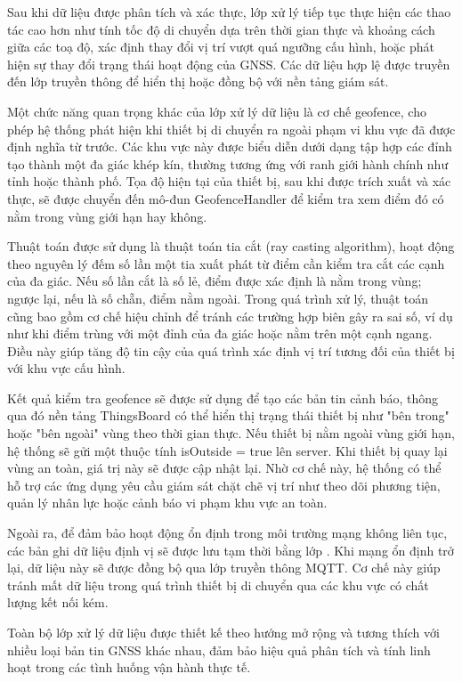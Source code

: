 \documentclass[../DoAn.tex]{subfiles}
\begin{document}
Sau khi dữ liệu được phân tích và xác thực, lớp xử lý tiếp tục thực hiện các thao tác cao hơn như tính tốc độ di chuyển dựa trên thời gian thực và khoảng cách giữa các toạ độ, xác định thay đổi vị trí vượt quá ngưỡng cấu hình, hoặc phát hiện sự thay đổi trạng thái hoạt động của GNSS. Các dữ liệu hợp lệ được truyền đến lớp truyền thông để hiển thị hoặc đồng bộ với nền tảng giám sát.

Một chức năng quan trọng khác của lớp xử lý dữ liệu là cơ chế geofence, cho phép hệ thống phát hiện khi thiết bị di chuyển ra ngoài phạm vi khu vực đã được định nghĩa từ trước. Các khu vực này được biểu diễn dưới dạng tập hợp các đỉnh tạo thành một đa giác khép kín, thường tương ứng với ranh giới hành chính như tỉnh hoặc thành phố. Tọa độ hiện tại của thiết bị, sau khi được trích xuất và xác thực, sẽ được chuyển đến mô-đun GeofenceHandler để kiểm tra xem điểm đó có nằm trong vùng giới hạn hay không.

Thuật toán được sử dụng là thuật toán tia cắt (ray casting algorithm), hoạt động theo nguyên lý đếm số lần một tia xuất phát từ điểm cần kiểm tra cắt các cạnh của đa giác. Nếu số lần cắt là số lẻ, điểm được xác định là nằm trong vùng; ngược lại, nếu là số chẵn, điểm nằm ngoài. Trong quá trình xử lý, thuật toán cũng bao gồm cơ chế hiệu chỉnh để tránh các trường hợp biên gây ra sai số, ví dụ như khi điểm trùng với một đỉnh của đa giác hoặc nằm trên một cạnh ngang. Điều này giúp tăng độ tin cậy của quá trình xác định vị trí tương đối của thiết bị với khu vực cấu hình.

Kết quả kiểm tra geofence sẽ được sử dụng để tạo các bản tin cảnh báo, thông qua đó nền tảng ThingsBoard có thể hiển thị trạng thái thiết bị như "bên trong" hoặc "bên ngoài" vùng theo thời gian thực. Nếu thiết bị nằm ngoài vùng giới hạn, hệ thống sẽ gửi một thuộc tính isOutside = true lên server. Khi thiết bị quay lại vùng an toàn, giá trị này sẽ được cập nhật lại. Nhờ cơ chế này, hệ thống có thể hỗ trợ các ứng dụng yêu cầu giám sát chặt chẽ vị trí như theo dõi phương tiện, quản lý nhân lực hoặc cảnh báo vi phạm khu vực an toàn.

Ngoài ra, để đảm bảo hoạt động ổn định trong môi trường mạng không liên tục, các bản ghi dữ liệu định vị sẽ được lưu tạm thời bằng lớp . Khi mạng ổn định trở lại, dữ liệu này sẽ được đồng bộ qua lớp truyền thông MQTT. Cơ chế này giúp tránh mất dữ liệu trong quá trình thiết bị di chuyển qua các khu vực có chất lượng kết nối kém.

Toàn bộ lớp xử lý dữ liệu được thiết kế theo hướng mở rộng và tương thích với nhiều loại bản tin GNSS khác nhau, đảm bảo hiệu quả phân tích và tính linh hoạt trong các tình huống vận hành thực tế.
\end{document}
